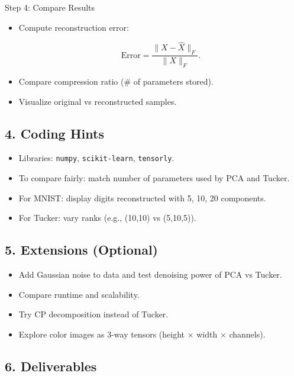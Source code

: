 \documentclass[
  letterpaper,
  DIV=11,
  numbers=noendperiod]{scrreprt}
\providecommand{\tightlist}{%
  \setlength{\itemsep}{0pt}\setlength{\parskip}{0pt}}
\begin{document}
Step 4: Compare Results

\begin{itemize}
\item
  Compute reconstruction error:

  \[
  \text{Error} = \frac{\|X - \hat{X}\|_F}{\|X\|_F}.
  \]
\item
  Compare compression ratio (\# of parameters stored).
\item
  Visualize original vs reconstructed samples.
\end{itemize}

\subsection{4. Coding Hints}\label{coding-hints-4}

\begin{itemize}
\tightlist
\item
  Libraries: \texttt{numpy}, \texttt{scikit-learn}, \texttt{tensorly}.
\item
  To compare fairly: match number of parameters used by PCA and Tucker.
\item
  For MNIST: display digits reconstructed with 5, 10, 20 components.
\item
  For Tucker: vary ranks (e.g., (10,10) vs (5,10,5)).
\end{itemize}

\subsection{5. Extensions (Optional)}\label{extensions-optional-4}

\begin{itemize}
\tightlist
\item
  Add Gaussian noise to data and test denoising power of PCA vs Tucker.
\item
  Compare runtime and scalability.
\item
  Try CP decomposition instead of Tucker.
\item
  Explore color images as 3-way tensors (height × width × channels).
\end{itemize}

\subsection{6. Deliverables}\label{deliverables-4}
\end{document}
